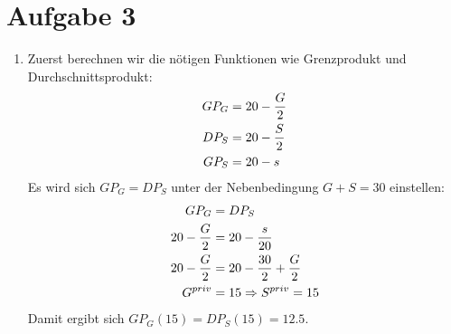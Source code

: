 \documentclass{article}
\begin{document}
	\section*{Aufgabe 3}
	\begin{enumerate}[label=(\alph*)]
		\item Zuerst berechnen wir die nötigen Funktionen wie Grenzprodukt und Durchschnittsprodukt:
		\begin{align}
			GP_G &= 20-\frac{G}{2} \notag \\
			DP_S &= 20-\frac{S}{2} \notag \\
			GP_S &= 20-s \notag
		\end{align}
		Es wird sich $GP_G=DP_S$ unter der Nebenbedingung $G+S=30$ einstellen:
		\begin{align}
			GP_G &= DP_S \notag \\
			20-\frac{G}{2} &= 20-\frac{s}{20} \notag \\
			20-\frac{G}{2} &= 20-\frac{30}{2} + \frac{G}{2} \notag \\
			G^{priv} &= 15 \Rightarrow S^{priv}= 15 \notag
		\end{align}
		Damit ergibt sich $GP_G(15)=DP_S(15)=12.5$.
		\begin{center}
\end{center}
\end{enumerate}
\end{document}
